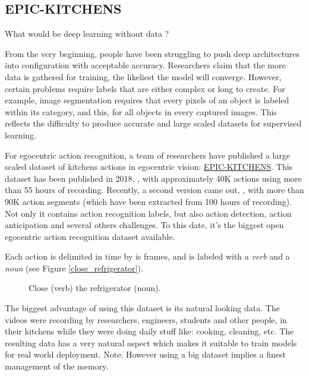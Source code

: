 \documentclass[12pt, a4paper]{report}
\begin{document}
			\subsection{EPIC-KITCHENS}
				What would be deep learning without data ?
				\par
				From the very beginning, people have been struggling to push deep architectures into configuration with acceptable accuracy.
				Researchers claim that the more data is gathered for training, the likeliest the model will converge.
				However, certain problems require labels that are either complex or long to create.
				For example, image segmentation requires that every pixels of an object is labeled within its category, and this, for all objects in every captured images.
				This reflects the difficulty to produce accurate and large scaled datasets for supervised learning.
				\par
				For egocentric action recognition, a team of researchers have published a large scaled dataset of kitchens actions in egocentric vision: \href{https://epic-kitchens.github.io/2021}{EPIC-KITCHENS}.
				This dataset has been published in 2018, \cite{damen2018scaling}, with approximately 40K actions using more than 55 hours of recording.
				Recently, a second version came out, \cite{damen2020rescaling}, with more than 90K action segments (which have been extracted from 100 hours of recording).
				Not only it contains action recognition labels, but also action detection, action anticipation and several others challenges.
				To this date, it's the biggest open egocentric action recognition dataset available.
				\par
				Each action is delimited in time by is frames, and is labeled with a {\itshape verb} and a {\itshape noun} (see Figure \ref{close_refrigerator}).
				\begin{figure}[h!]
					\centering
					\caption{Close ({\small verb}) the refrigerator ({\small noun}).}
				\end{figure}
				The biggest advantage of using this dataset is its natural looking data.
				The videos were recording by researchers, engineers, students and other people, in their kitchens while they were doing daily stuff like: cooking, cleaning, etc.
				The resulting data has a very natural aspect which makes it suitable to train models for real world deployment.
				Note: However using a big dataset implies a finest management of the memory.%
\end{document}
